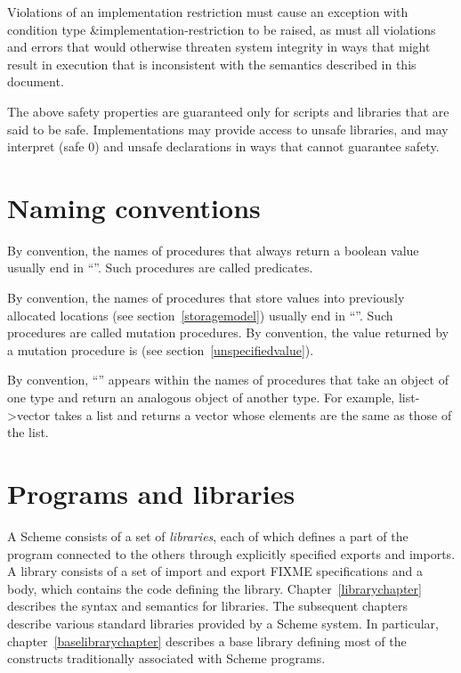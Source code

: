 Violations of an implementation restriction must cause an
exception with condition type {\cf\&implementation-restriction}
to be raised, as must all
violations and errors that would otherwise threaten system
integrity in ways that might result in execution that is
inconsistent with the semantics described in this document.

The above safety properties are guaranteed only for scripts
and libraries that are said to be safe.  Implementations
may provide access to unsafe libraries, and may interpret
{\cf (safe 0)} and {\cf unsafe} declarations in ways that
cannot guarantee safety.

\section{Naming conventions}

By convention, the names of procedures that always return a boolean
value usually end
in ``''.  Such procedures are called predicates.

By convention, the names of procedures that store values into previously
allocated locations (see section~\ref{storagemodel}) usually end in
``\ide{!}''.
Such procedures are called mutation procedures.
By convention, the value returned by a mutation procedure is
\unspecifiedreturn{} (see section~\ref{unspecifiedvalue}).

By convention, ``\ide{->}'' appears within the names of procedures that
take an object of one type and return an analogous object of another type.
For example, {\cf list->vector} takes a list and returns a vector whose
elements are the same as those of the list.


        

\section{Programs and libraries}

A Scheme consists of a set of \textit{libraries}, each
of which defines a part of the program connected to the others through
explicitly specified exports and imports.  A library consists of a set
of import and export FIXME specifications and a body, which contains
the code defining the library.  Chapter~\ref{librarychapter} describes
the syntax and semantics for libraries.  The subsequent chapters
describe various standard libraries provided by a Scheme system.  In
particular, chapter~\ref{baselibrarychapter} describes a base
library defining most of the constructs traditionally associated with
Scheme programs.

